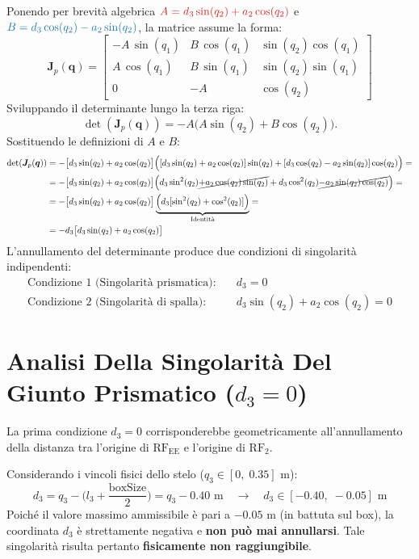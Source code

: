 \documentclass[11pt, a4paper]{report}
\begin{document}
Ponendo per brevità algebrica $\textcolor{mathRed}{A = d_{3}\sin(q_{2}) + a_{2}\cos(q_{2})}$ e $\textcolor{mathBlue}{B = d_{3}\cos(q_{2}) - a_{2}\sin(q_{2})}$, la matrice assume la forma:
\[
\bm{J}_p(\bm{q}) =
\begin{bmatrix}
    -A \, \sin(q_{1}) & B \, \cos(q_{1}) & \sin(q_2) \cos(q_1) \\
    A \, \cos(q_{1}) & B \, \sin(q_{1}) & \sin(q_2) \sin(q_1) \\
    0 & -A & \cos(q_2)
\end{bmatrix}
\]
Sviluppando il determinante lungo la terza riga:
\[
    \det(\bm{J}_p(\bm{q})) = - A \bigl(A \sin(q_{2}) + B \cos(q_{2})\bigr).
\]
Sostituendo le definizioni di $A$ e $B$:
\begin{align*}
    \det(\bm{J}_p(\bm{q})) &= - \bigl[d_{3}\sin(q_{2}) + a_{2}\cos(q_{2})\bigr] \Bigl([d_{3}\sin(q_{2}) + a_{2}\cos(q_{2})] \sin(q_{2}) + [d_{3}\cos(q_{2}) - a_{2}\sin(q_{2})] \cos(q_{2})\Bigr) =\\
    &= - \bigl[d_{3}\sin(q_{2}) + a_{2}\cos(q_{2})\bigr] \Bigl(d_{3}\sin^{2}(q_{2}) \cancel{+ a_{2}\cos(q_{2})\sin(q_{2})} + d_{3}\cos^{2}(q_{2}) \cancel{- a_{2}\sin(q_{2})\cos(q_{2})}\Bigr) =\\
    &= - \bigl[d_{3}\sin(q_{2}) + a_{2}\cos(q_{2})\bigr] \underbrace{\Bigl(d_{3}[\sin^{2}(q_{2}) + \cos^{2}(q_{2})]\Bigr)}_{\text{Identità}} =\\
    &= - d_{3}\bigl[d_{3}\sin(q_{2}) + a_{2}\cos(q_{2})\bigr]
\end{align*}
L'annullamento del determinante produce due condizioni di singolarità indipendenti:
\begin{align*}
    \text{Condizione 1 (Singolarità prismatica):} \quad & d_3 = 0 \\
    \text{Condizione 2 (Singolarità di spalla):} \quad & d_3 \sin(q_2) + a_2 \cos(q_2) = 0
\end{align*}
\newpage
\section{Analisi Della Singolarità Del Giunto Prismatico ($d_3 = 0$)}
La prima condizione $d_3 = 0$ corrisponderebbe geometricamente all'annullamento della distanza tra l'origine di $\text{RF}_{\text{EE}}$ e l'origine di $\text{RF}_2$.

Considerando i vincoli fisici dello stelo ($q_3 \in [0, \; 0.35]\text{ m}$):
\[
    d_3 = q_3 - \biggl(l_3 + \frac{\text{boxSize}}{2}\biggr) = q_3 - 0.40\text{ m} \quad\longrightarrow\quad d_3 \in [-0.40, \; -0.05]\text{ m}
\]
Poiché il valore massimo ammissibile è pari a $-0.05\text{ m}$ (in battuta sul box), la coordinata $d_3$ è strettamente negativa e \textbf{non può mai annullarsi}. Tale singolarità risulta pertanto \textbf{fisicamente non raggiungibile}.
\end{document}
